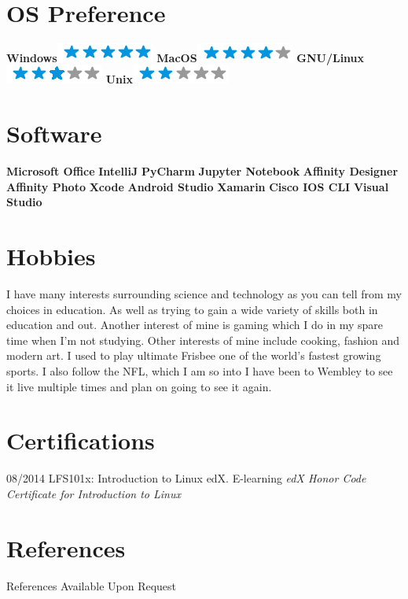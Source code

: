 \documentclass[]{friggeri-cv}
\begin{document}
\begin{aside}
~
~
~
  \section{OS Preference}
    \textbf{Windows}\includegraphics[scale=0.40]{img/5stars.png}
    \textbf{MacOS}\includegraphics[scale=0.40]{img/4stars.png}
    \textbf{GNU/Linux}\includegraphics[scale=0.40]{img/3stars.png}
    \textbf{Unix}\includegraphics[scale=0.40]{img/2stars.png}
    ~
  \section{Software}
\textbf{Microsoft Office}
\textbf{IntelliJ}
\textbf{PyCharm}
\textbf{Jupyter Notebook}
\textbf{Affinity Designer}
\textbf{Affinity Photo}
\textbf{Xcode}
\textbf{Android Studio}
\textbf{Xamarin}
\textbf{Cisco IOS CLI}
\textbf{Visual Studio}
	~
\end{aside}

\section{Hobbies}
I have many interests surrounding science and technology as you can tell from my choices in
education. As well as trying to gain a wide variety of skills both in education and out. Another interest
of mine is gaming which I do in my spare time when I'm not studying. Other interests of mine include
cooking, fashion and modern art. I used to play ultimate Frisbee one of the world's fastest growing
sports. I also follow the NFL, which I am so into I have been to Wembley to see it live multiple times
and plan on going to see it again.
\\
\section{Certifications}
\begin{entrylist}
  \entry
    {08/2014}
    {LFS101x: Introduction to Linux}
    {edX. E-learning}
    {\emph{edX Honor Code Certificate for Introduction to Linux}}
\end{entrylist}

\section{References}
References Available Upon Request
\\
\end{document}
